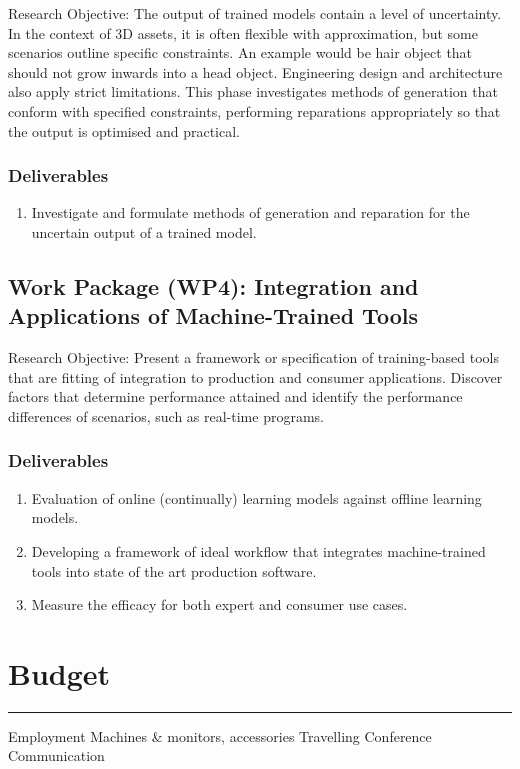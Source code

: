 \documentclass[a4paper, fontsize=15pt, onecolumn]{article} %
\numberwithin{equation}{section} %
\numberwithin{figure}{section} %
\numberwithin{table}{section} %
\begin{document}
Research Objective: The output of trained models contain a level of uncertainty. In the context of 3D assets, it is often flexible with approximation, but some scenarios outline specific constraints. An example would be hair object that should not grow inwards into a head object. Engineering design and architecture also apply strict limitations. This phase investigates methods of generation that conform with specified constraints, performing reparations appropriately so that the output is optimised and practical.

\subsubsection{Deliverables}
\begin{enumerate}
	\item Investigate and formulate methods of generation and reparation for the uncertain output of a trained model.
\end{enumerate}

\subsection{Work Package (WP4): Integration and Applications of Machine-Trained Tools}
Research Objective: Present a framework or specification of training-based tools that are fitting of integration to production and consumer applications. Discover factors that determine performance attained and identify the performance differences of scenarios, such as real-time programs.

\subsubsection{Deliverables}
\begin{enumerate}
	\item Evaluation of online (continually) learning models against offline learning models.
	\item Developing a framework of ideal workflow that integrates machine-trained tools into state of the art production software.
	\item Measure the efficacy for both expert and consumer use cases.
\end{enumerate}
	


\newpage

\section*{Budget}
\hrule
Employment
Machines \& monitors, accessories
Travelling
Conference
Communication
\end{document}
